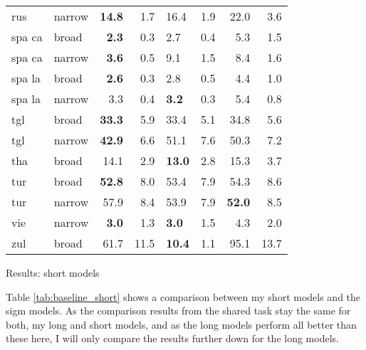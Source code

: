 {\begin{tabularx}{\textwidth}{|l|X||r|r||X|X||r|r|}
rus    & narrow & \textbf{14.8} & 1.7  & 16.4 & 1.9  & 22.0 & 3.6  \\
spa ca & broad  & \textbf{2.3}  & 0.3  & 2.7  & 0.4  & 5.3  & 1.5  \\
spa ca & narrow & \textbf{3.6}  & 0.5  & 9.1  & 1.5  & 8.4  & 1.6  \\
spa la & broad  & \textbf{2.6}  & 0.3  & 2.8  & 0.5  & 4.4  & 1.0  \\
spa la & narrow & 3.3  & 0.4  & \textbf{3.2}  & 0.3  & 5.4  & 0.8  \\
tgl    & broad  & \textbf{33.3} & 5.9  & 33.4 & 5.1  & 34.8 & 5.6  \\
tgl    & narrow & \textbf{42.9} & 6.6  & 51.1 & 7.6  & 50.3 & 7.2  \\
tha    & broad  & 14.1 & 2.9  & \textbf{13.0} & 2.8  & 15.3 & 3.7  \\
tur    & broad  & \textbf{52.8} & 8.0  & 53.4 & 7.9  & 54.3 & 8.6  \\
tur    & narrow & 57.9 & 8.4  & 53.9 & 7.9  & \textbf{52.0} & 8.5  \\
vie    & narrow & \textbf{3.0}  & 1.3  & \textbf{3.0}  & 1.5  & 4.3  & 2.0  \\
zul    & broad  & 61.7 & 11.5 & \textbf{10.4} & 1.1  & 95.1 & 13.7 \\ \hline
\end{tabularx}
}{Results: short models}

Table \ref{tab:baseline_short} shows a comparison between my short models and the \ac{sigm} models. As the comparison results from the shared task stay the same for both, my long and short models, and as the long models perform all better than these here, I will only compare the results further down for the long models.


